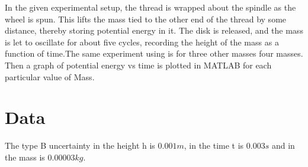 
In the given experimental setup, the thread is wrapped about the spindle as the wheel is spun. This lifts the mass tied to the other end of the thread by some distance, thereby storing potential energy in it. The disk is released, and the mass is let to oscillate for about five cycles, recording the height of the mass as a function of time.The same experiment using is for three other masses four masses. Then a graph of potential energy vs time is plotted in MATLAB for each particular value of Mass.

\section{Data}
The type B uncertainty in the height h is $0.001m$, in the time t is $0.003s$ and in the mass is $0.00003kg$.

